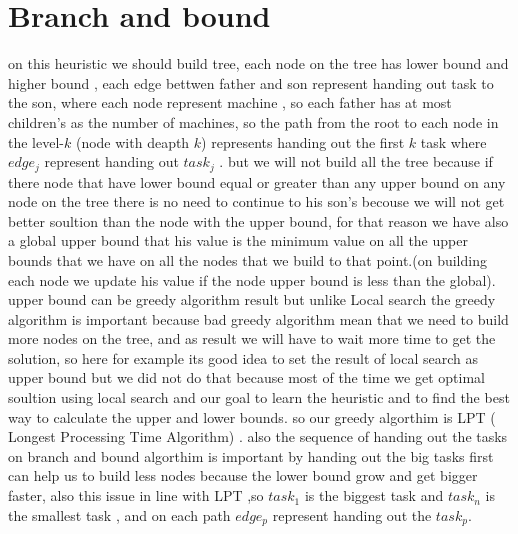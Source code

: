 \documentclass[11pt,fullpage]{article}
\begin{document}
\section{Branch and bound}
on this heuristic we should build tree, each node on the tree has lower bound and higher bound , each edge bettwen father and son represent handing out task to the son, where each node represent machine , so each father has at most children's as the number of machines, so the path from the root to each node in the level-$k$ (node with deapth $k$) represents handing out the first $k$ task where $edge_j$ represent handing out $task_j$  . but we will not build all the tree because if there node that have lower bound equal or greater than any upper bound on any node on the tree there is no need to continue to his son's becouse we will not get better soultion than the node with the upper bound, for that reason we have also a global upper bound that his value is the minimum value on all  the upper bounds that we have on all the nodes that we build to that point.(on building each node we update his value if the node upper bound is less than the global). upper bound can be greedy algorithm  result but unlike Local search the greedy algorithm is important because bad greedy algorithm mean that we need to build more nodes on the tree, and as result we will have to wait more time to get the solution, so here for example its good idea to set the result of local search as upper bound but we did not do that because  most of the time we get optimal soultion using local search and  our goal to learn the  heuristic and to find the best way to calculate the upper and lower bounds.\newline
so our greedy algorthim is LPT ( Longest Processing Time Algorithm) . also the sequence of handing out the tasks on branch and bound algorthim is important by handing out the big tasks first can help us to build less nodes because  the lower bound grow and get bigger faster, also this issue in line with LPT ,so $task_1$ is the biggest task and $task_n$ is the smallest task , and on each path  $edge_p$ represent handing out the $task_p$.\newline
\end{document}
